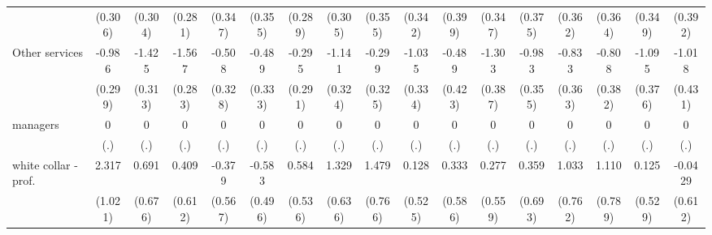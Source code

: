 {\begin{tabular}{l*{16}{c}}
                    &     (0.306)         &     (0.304)         &     (0.281)         &     (0.347)         &     (0.355)         &     (0.289)         &     (0.305)         &     (0.355)         &     (0.342)         &     (0.399)         &     (0.347)         &     (0.375)         &     (0.362)         &     (0.364)         &     (0.349)         &     (0.392)         \\
[1em]
Other services      &      -0.986\sym{***}&      -1.425\sym{***}&      -1.567\sym{***}&      -0.508         &      -0.489         &      -0.295         &      -1.141\sym{***}&      -0.299         &      -1.035\sym{**} &      -0.489         &      -1.303\sym{***}&      -0.983\sym{**} &      -0.833\sym{*}  &      -0.808\sym{*}  &      -1.095\sym{**} &      -1.018\sym{*}  \\
                    &     (0.299)         &     (0.313)         &     (0.283)         &     (0.328)         &     (0.333)         &     (0.291)         &     (0.324)         &     (0.325)         &     (0.334)         &     (0.423)         &     (0.387)         &     (0.355)         &     (0.363)         &     (0.382)         &     (0.376)         &     (0.431)         \\
[1em]
managers            &           0         &           0         &           0         &           0         &           0         &           0         &           0         &           0         &           0         &           0         &           0         &           0         &           0         &           0         &           0         &           0         \\
                    &         (.)         &         (.)         &         (.)         &         (.)         &         (.)         &         (.)         &         (.)         &         (.)         &         (.)         &         (.)         &         (.)         &         (.)         &         (.)         &         (.)         &         (.)         &         (.)         \\
[1em]
white collar - prof.&       2.317\sym{*}  &       0.691         &       0.409         &      -0.379         &      -0.583         &       0.584         &       1.329\sym{*}  &       1.479         &       0.128         &       0.333         &       0.277         &       0.359         &       1.033         &       1.110         &       0.125         &     -0.0429         \\
                    &     (1.021)         &     (0.676)         &     (0.612)         &     (0.567)         &     (0.496)         &     (0.536)         &     (0.636)         &     (0.766)         &     (0.525)         &     (0.586)         &     (0.559)         &     (0.693)         &     (0.762)         &     (0.789)         &     (0.529)         &     (0.612)         \\

\end{tabular}}
